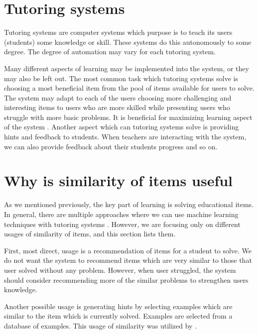 \documentclass[
  digital, %
  table,   %
  nolof,     %
  nolot,     %
  nocover,
  color,
  final, %
]{fithesis3}
\begin{document}
\section{Tutoring systems}\label{tutoring-systems}

Tutoring systems are computer systems which purpose is to teach its users (students) some knowledge or skill. These systems do this autonomously to some degree. The degree of automation may vary for each tutoring system.


Many different aspects of learning may be implemented into the system, or they may also be left out. The most common task which tutoring systems solve is choosing a most beneficial item from the pool of items available for users to solve. The system may adapt to each of the users choosing more challenging and interesting items to users who are more skilled while presenting users who struggle with more basic problems. It is beneficial for maximizing learning aspect of the system \cite{papouvsek2015impact}. Another aspect which can tutoring systems solve is providing hints and feedback to students. When teachers are interacting with the system, we can also provide feedback about their students progress and so on.


\section{Why is similarity of items useful}\label{why-is-similarity-of-items-useful}


As we mentioned previously, the key part of learning is solving educational items. In general, there are multiple approaches where we can use machine learning techniques with tutoring systems \cite{baker2010data}. However, we are focusing only on different usages of similarity of items, and this section lists them.

First, most direct, usage is a recommendation of items for a student to solve. We do not want the system to recommend items which are very similar to those that user solved without any problem. However, when user struggled, the system should consider recommending more of the similar problems to strengthen users knowledge.

Another possible usage is generating hints by selecting examples which are similar to the item which is currently solved. Examples are selected from a database of examples. This usage of similarity was utilized by \citeauthor{hosseini2017study}\cite{hosseini2017study}.
\end{document}
